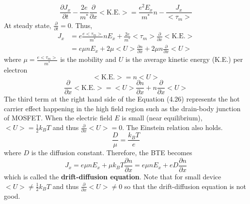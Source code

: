 \begin{equation}
    \frac{\partial J_{x}}{\partial t}-\frac{2e}{m^{*}}\frac{\partial}{\partial x}\big<\text{K.E.}\big> = \frac{e^{2}E_{x}}{m^{*}}n - \frac{J_{x}}{\big<\tau_{m}\big>}
\end{equation} At steady state, $\frac{\partial}{\partial t} = 0$. Thus, \begin{align}
    \boxed{J_{x}}& = e\frac{e\big<\tau_{m}\big>}{m^{*}}nE_{x} + \frac{2e}{m^{*}}\big<\tau_{m}\big>\frac{\partial}{\partial x}\big<\text{K.E.}\big>\nonumber\\
    & = \boxed{e\mu nE_{x} + 2\mu\big<U\big>\frac{\partial n}{\partial x} + 2\mu n\frac{\partial}{\partial x}\big<U\big>}
\end{align} where $\mu = \frac{e\big<\tau_{m}\big>}{m^{*}}$ is the mobility and $U$ is the average kinetic energy (K.E.) per electron \begin{equation}
    \big<\text{K.E.}\big> = n\big<U\big>\nonumber
\end{equation} \begin{equation}
    \frac{\partial}{\partial x}\big<\text{K.E.}\big> = \big<U\big>\frac{\partial n}{\partial x} + n\frac{\partial}{\partial x}\big<U\big>
\end{equation} The third term at the right hand side of the Equation (4.26) represents the hot carrier effect happening in the high field region such as the drain-body junction of MOSFET. When the electric field $E$ is small (near equilibrium), $\big<U\big> = \frac{1}{2}k_{B}T$ and thus $\frac{\partial}{\partial x}\big<U\big> = 0$. The Einstein relation also holds. \begin{equation}
    \frac{D}{\mu} = \frac{k_{B}T}{e}
\end{equation} where $D$ is the diffusion constant. Therefore, the BTE becomes \begin{equation}
    \boxed{J_{x} = e\mu nE_{x} + \mu k_{B}T\frac{\partial n}{\partial x} = e\mu n E_{x} + eD\frac{\partial n}{\partial x}}
\end{equation} which is called the {\bf drift-diffusion equation}. Note that for small device $\big<U\big> \neq \frac{1}{2}k_{B}T$ and thus $\frac{\partial}{\partial x}\big<U\big> \neq 0$ so that the drift-diffusion equation is not good.